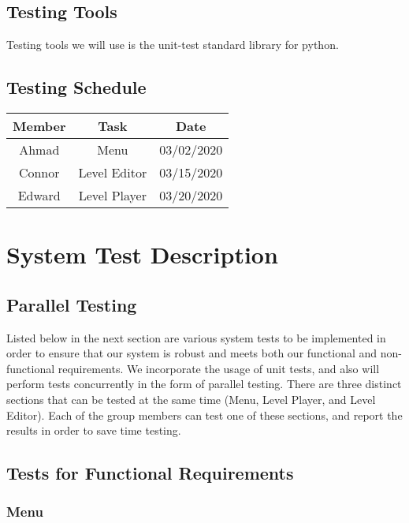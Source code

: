 \documentclass[12pt, titlepage]{article}
\begin{document}
\subsection{Testing Tools}
Testing tools we will use is the unit-test standard library for python.

\subsection{Testing Schedule}

\begin{tabular}[pos]{|c|c|c|}
\hline
\textbf{Member}& \textbf{Task} & \textbf{Date} \\ \hline
Ahmad & Menu & 03/02/2020\\ \hline
Connor & Level Editor & 03/15/2020\\ \hline
Edward & Level Player & 03/20/2020\\ \hline
\end{tabular}

\newpage

\section{System Test Description}

\color{red}
\subsection{Parallel Testing}
Listed below in the next section are various system tests to be implemented in order to ensure that our system is robust and meets both our functional and non-functional requirements. We incorporate the usage of unit tests, and also will perform tests concurrently in the form of parallel testing. There are three distinct sections that can be tested at the same time (Menu, Level Player, and Level Editor). Each of the group members can test one of these sections, and report the results in order to save time testing.

\color{black}	
\subsection{Tests for Functional Requirements}

\subsubsection{Menu}
\end{document}
